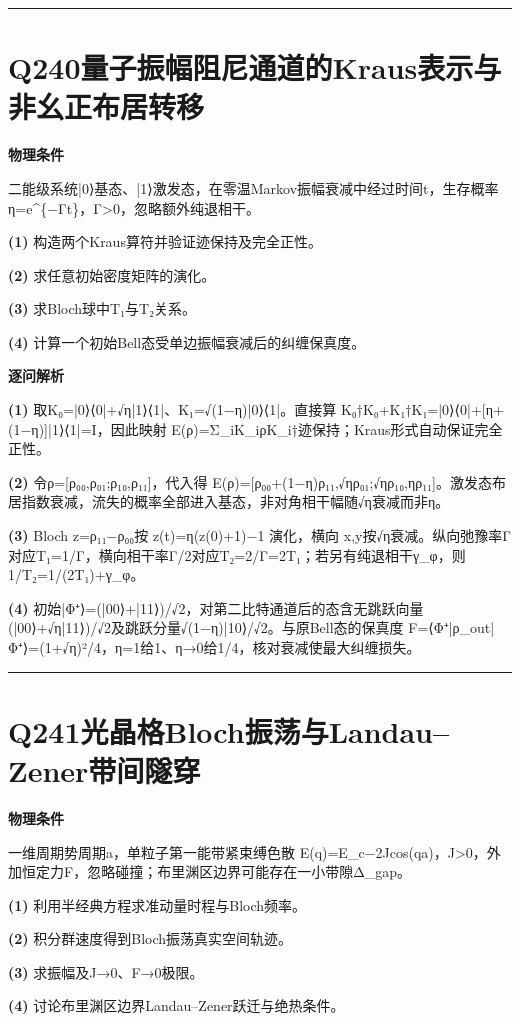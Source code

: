 \documentclass[UTF8,a4paper,11pt,oneside,openany]{ctexbook}
\begin{document}
\par\bigskip\hrule\bigskip
\section*{Q240\quad 量子振幅阻尼通道的Kraus表示与非幺正布居转移}
\textbf{物理条件}\par 二能级系统|0⟩基态、|1⟩激发态，在零温Markov振幅衰减中经过时间t，生存概率η=e\textasciicircum{}\{−Γt\}，Γ>0，忽略额外纯退相干。
\par\noindent\textbf{(1)} 构造两个Kraus算符并验证迹保持及完全正性。
\par\noindent\textbf{(2)} 求任意初始密度矩阵的演化。
\par\noindent\textbf{(3)} 求Bloch球中T₁与T₂关系。
\par\noindent\textbf{(4)} 计算一个初始Bell态受单边振幅衰减后的纠缠保真度。

\par\medskip\noindent\textbf{逐问解析}
\par\noindent\textbf{(1)} 取K₀=|0⟩⟨0|+√η|1⟩⟨1|、K₁=√(1−η)|0⟩⟨1|。直接算 K₀†K₀+K₁†K₁=|0⟩⟨0|+[η+(1−η)]|1⟩⟨1|=I，因此映射 E(ρ)=Σ\_iK\_iρK\_i†迹保持；Kraus形式自动保证完全正性。
\par\noindent\textbf{(2)} 令ρ=[ρ₀₀,ρ₀₁;ρ₁₀,ρ₁₁]，代入得 E(ρ)=[ρ₀₀+(1−η)ρ₁₁,√ηρ₀₁;√ηρ₁₀,ηρ₁₁]。激发态布居指数衰减，流失的概率全部进入基态，非对角相干幅随√η衰减而非η。
\par\noindent\textbf{(3)} Bloch z=ρ₁₁−ρ₀₀按 z(t)=η(z(0)+1)−1 演化，横向 x,y按√η衰减。纵向弛豫率Γ对应T₁=1/Γ，横向相干率Γ/2对应T₂=2/Γ=2T₁；若另有纯退相干γ\_φ，则1/T₂=1/(2T₁)+γ\_φ。
\par\noindent\textbf{(4)} 初始|Φ⁺⟩=(|00⟩+|11⟩)/√2，对第二比特通道后的态含无跳跃向量(|00⟩+√η|11⟩)/√2及跳跃分量√(1−η)|10⟩/√2。与原Bell态的保真度 F=⟨Φ⁺|ρ\_out|Φ⁺⟩=(1+√η)²/4，η=1给1、η→0给1/4，核对衰减使最大纠缠损失。

\par\bigskip\hrule\bigskip
\section*{Q241\quad 光晶格Bloch振荡与Landau–Zener带间隧穿}
\textbf{物理条件}\par 一维周期势周期a，单粒子第一能带紧束缚色散 E(q)=E\_c−2Jcos(qa)，J>0，外加恒定力F，忽略碰撞；布里渊区边界可能存在一小带隙Δ\_gap。
\par\noindent\textbf{(1)} 利用半经典方程求准动量时程与Bloch频率。
\par\noindent\textbf{(2)} 积分群速度得到Bloch振荡真实空间轨迹。
\par\noindent\textbf{(3)} 求振幅及J→0、F→0极限。
\par\noindent\textbf{(4)} 讨论布里渊区边界Landau–Zener跃迁与绝热条件。
\end{document}
